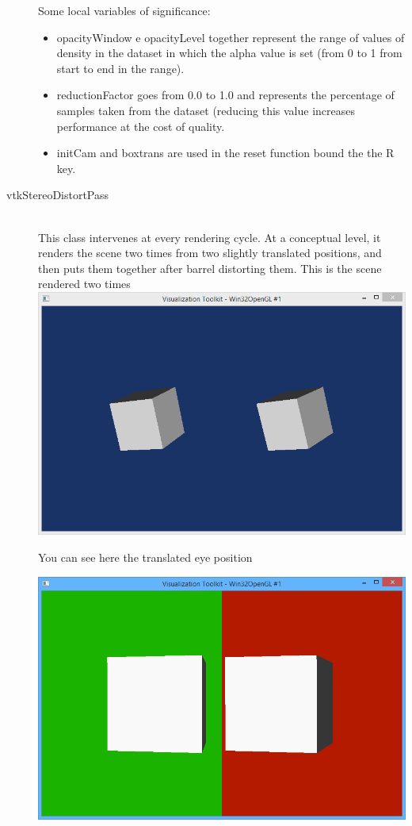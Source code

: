 \documentclass[11pt]{article} %
\begin{document}
\begin{description}
Some local variables of significance:
\begin{itemize}
\item opacityWindow e opacityLevel together represent the range of values of density in the dataset in which the alpha value is set (from 0 to 1 from start to end in the range).
\item reductionFactor goes from 0.0 to 1.0 and represents the percentage of samples taken from the dataset (reducing this value increases performance at the cost of quality.
\item initCam and boxtrans are used in the reset function bound the the R key.
\end{itemize}
\item[vtkStereoDistortPass] \hfill \\
This class intervenes at every rendering cycle. At a conceptual level, it renders the scene two times from two slightly translated positions, and then puts them together after barrel distorting them.
This is the scene rendered two times
\includegraphics[width=1.0\linewidth]{img/stereodistortpass_stereoonly.PNG}

You can see here the translated eye position

\includegraphics[width=1.0\linewidth]{img/stereodistortpass_eyedistance.PNG}


\end{description}
\end{document}
